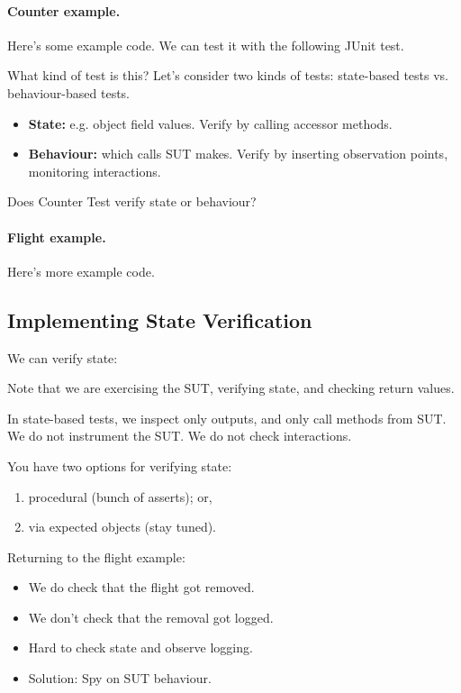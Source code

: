 \documentclass[11pt]{article}
\newenvironment{itemizep}{
 \begin{itemize}
  \setlength{\itemsep}{0pt}
  \setlength{\parsep}{3pt}
  \setlength{\topsep}{3pt}
  \setlength{\partopsep}{0pt}
  \setlength{\leftmargin}{1.5em}
  \setlength{\labelwidth}{1em}
  \setlength{\labelsep}{0.5em} }
 {\end{itemize}}
\newenvironment{enumeratep}{
 \begin{enumerate}
  \setlength{\itemsep}{0pt}
  \setlength{\parsep}{3pt}
  \setlength{\topsep}{3pt}
  \setlength{\partopsep}{0pt}
  \setlength{\leftmargin}{1.5em}
  \setlength{\labelwidth}{1em}
  \setlength{\labelsep}{0.5em} }
 {\end{enumerate}}
\begin{document}
\newpage
\paragraph{Counter example.} Here's some example code.
We can test it with the following JUnit test.

What kind of test is this? Let's consider two kinds of
tests: state-based tests vs. behaviour-based tests.

\begin{itemizep}
\item {\bf State:} e.g. object field values.
    Verify by calling accessor methods.
  \item {\bf Behaviour:} which calls SUT makes.
    Verify by inserting observation points, monitoring interactions.
\end{itemizep}

Does Counter Test verify state or behaviour?

\paragraph{Flight example.} Here's more example code.

\subsection*{Implementing State Verification}
We can verify state:

Note that we are exercising the SUT, verifying state,
and checking return values.

In state-based tests, we inspect only outputs, and only call methods from SUT. We do not instrument the SUT. We do not check interactions.

You have two options for verifying state:
\begin{enumeratep}
\item procedural (bunch of asserts); or,
\item via expected objects (stay tuned).
\end{enumeratep}

Returning to the flight example:
\begin{itemizep}
\item We do check that the flight got removed.
\item We don't check that the removal got logged.
\item Hard to check state and observe logging.
\item Solution: Spy on SUT behaviour.
\end{itemizep}
\end{document}
